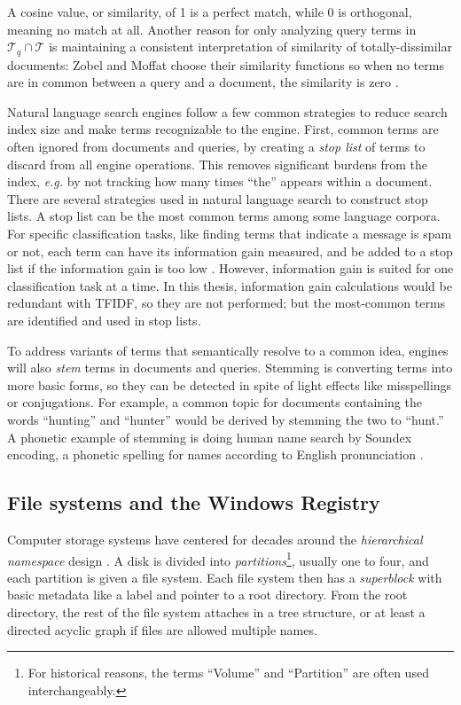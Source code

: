 \documentclass[11pt]{ucthesis}
\theoremstyle{plain}
\theoremstyle{definition}
\newcommand{\eg}{\emph{e.g.}\xspace}
\begin{document}
A cosine value, or similarity, of 1 is a perfect match, while 0 is orthogonal, meaning no match at all.  Another reason for only analyzing query terms in $\mathcal{T}_{q} \cap \mathcal{T}$ is maintaining a consistent interpretation of similarity of totally-dissimilar documents:  Zobel and Moffat choose their similarity functions so when no terms are in common between a query and a document, the similarity is zero \cite[Section 2]{zobel:sigir98}.

Natural language search engines follow a few common strategies to reduce search index size and make terms recognizable to the engine.  First, common terms are often ignored from documents and queries, by creating a \emph{stop list} of terms to discard from all engine operations.  This removes significant burdens from the index, \eg by not tracking how many times ``the'' appears within a document.  There are several strategies used in natural language search to construct stop lists.  A stop list can be the most common terms among some language corpora.  For specific classification tasks, like finding terms that indicate a message is spam or not, each term can have its information gain measured, and be added to a stop list if the information gain is too low \cite{croft:addison-wesley10}.  However, information gain is suited for one classification task at a time.  In this thesis, information gain calculations would be redundant with TFIDF, so they are not performed; but the most-common terms are identified and used in stop lists.

To address variants of terms that semantically resolve to a common idea, engines will also \emph{stem} terms in documents and queries.  Stemming is converting terms into more basic forms, so they can be detected in spite of light effects like misspellings or conjugations.  For example, a common topic for documents containing the words ``hunting'' and ``hunter'' would be derived by stemming the two to ``hunt.''  A phonetic example of stemming is doing human name search by Soundex encoding, a phonetic spelling for names according to English pronunciation \cite{US1261167A}.


\subsection{File systems and the Windows Registry}

Computer storage systems have centered for decades around the \emph{hierarchical namespace} design \cite{seltzer:hotos09}.  A disk is divided into \emph{partitions}\footnote{For historical reasons, the terms ``Volume'' and ``Partition'' are often used interchangeably.}, usually one to four, and each partition is given a file system.  Each file system then has a \emph{superblock} with basic metadata like a label and pointer to a root directory.  From the root directory, the rest of the file system attaches in a tree structure, or at least a directed acyclic graph if files are allowed multiple names.
\end{document}
